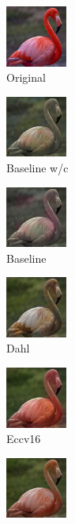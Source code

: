 \documentclass[10pt,twocolumn,letterpaper]{article}
\begin{document}
\begin{figure}[ht]
	\vspace{0.1cm}
	\begin{subfigure}[b]{0.1\textwidth}
		\centering
		\includegraphics[width=2cm]{or - flamingo.jpg}
		\caption{Original}
	\end{subfigure}
	\hfill
	\begin{subfigure}[b]{0.1\textwidth}
		\includegraphics[width=2cm]{bw - flamingo.jpg}
		\caption{Baseline w/c}
	\end{subfigure}
	\hfill
	\begin{subfigure}[b]{0.1\textwidth}
		\includegraphics[width=2cm]{b - flamingo.jpg}
		\caption{Baseline}
	\end{subfigure}
	\hfill
	\begin{subfigure}[b]{0.1\textwidth}
		\includegraphics[width=2cm]{d - flamingo.jpg}
		\caption{Dahl}
	\end{subfigure}
	\hfill
	\begin{subfigure}[b]{0.1\textwidth}
		\includegraphics[width=2cm]{z - flamingo.jpg}
		\caption{Eccv16}
	\end{subfigure}
	\hfill
	\begin{subfigure}[b]{0.1\textwidth}
		\includegraphics[width=2cm]{si- flamingo.jpg}

\end{subfigure}
\end{figure}
\end{document}
